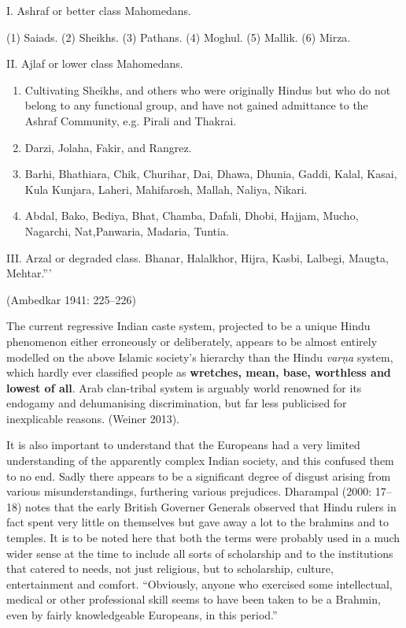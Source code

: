 I. Ashraf or better class Mahomedans.

(1) Saiads. (2) Sheikhs. (3) Pathans. (4) Moghul. (5) Mallik. (6) Mirza.

II. Ajlaf or lower class Mahomedans.

\begin{enumerate}
\itemsep=0pt
\item Cultivating Sheikhs, and others who were originally Hindus but who do not belong to any functional group, and have not gained admittance to the Ashraf Community, e.g. Pirali and Thakrai.

 \item Darzi, Jolaha, Fakir, and Rangrez.

 \item Barhi, Bhathiara, Chik, Churihar, Dai, Dhawa, Dhunia, Gaddi, Kalal, Kasai, Kula Kunjara, Laheri, Mahifarosh, Mallah, Naliya, Nikari.

 \item Abdal, Bako, Bediya, Bhat, Chamba, Dafali, Dhobi, Hajjam, Mucho, Nagarchi, Nat,Panwaria, Madaria, Tuntia.

\end{enumerate}

III. Arzal or degraded class. Bhanar, Halalkhor, Hijra, Kasbi, Lalbegi, Maugta, Mehtar.”’

\vspace{-.3cm}

\begin{flushright}
(Ambedkar 1941: 225–226)
\end{flushright}

The current regressive Indian caste system, projected to be a unique Hindu phenomenon either erroneously or deliberately, appears to be almost entirely modelled on the above Islamic society's hierarchy than the Hindu \textit{varṇa} system, which hardly ever classified people as \textbf{wretches, mean, base, worthless and lowest of all}. Arab clan-tribal system is arguably world renowned for its endogamy and dehumanising discrimination, but far less publicised for inexplicable reasons. (Weiner 2013).

\newpage

It is also important to understand that the Europeans had a very limited understanding of the apparently complex Indian society, and this confused them to no end. Sadly there appears to be a significant degree of disgust arising from various misunderstandings, furthering various prejudices. Dharampal (2000: 17–18) notes that the early British Governer Generals observed that Hindu rulers in fact spent very little on themselves but gave away a lot to the brahmins and to temples. It is to be noted here that both the terms were probably used in a much wider sense at the time to include all sorts of scholarship and to the institutions that catered to needs, not just religious, but to scholarship, culture, entertainment and comfort. “Obviously, anyone who exercised some intellectual, medical or other professional skill seems to have been taken to be a Brahmin, even by fairly knowledgeable Europeans, in this period.”

